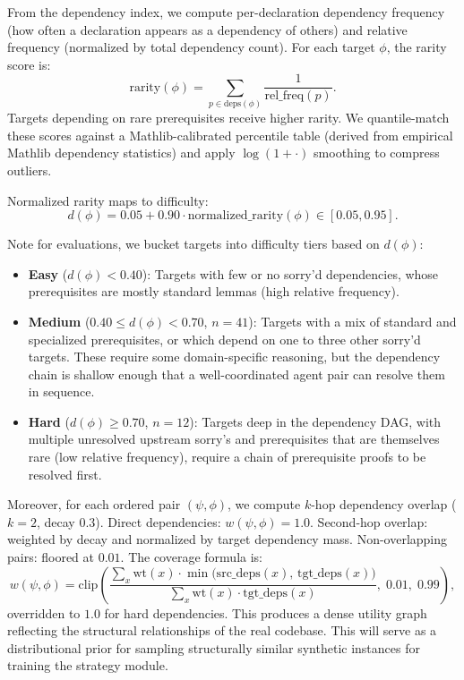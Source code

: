 From the dependency index, we compute per-declaration dependency frequency (how often a declaration appears as a dependency of others) and relative frequency (normalized by total dependency count). For each target $\phi$, the rarity score is:
\[
\mathrm{rarity}(\phi) = \sum_{p \in \mathrm{deps}(\phi)} \frac{1}{\mathrm{rel\_freq}(p)}.
\]
Targets depending on rare prerequisites receive higher rarity. We quantile-match these scores against a Mathlib-calibrated percentile table (derived from empirical Mathlib dependency statistics) and apply $\log(1+\cdot)$ smoothing to compress outliers.

Normalized rarity maps to difficulty:
\[
d(\phi) = 0.05 + 0.90 \cdot \mathrm{normalized\_rarity}(\phi) \in [0.05, 0.95].
\]

Note for evaluations, we bucket targets into difficulty tiers based on $d(\phi)$:
\begin{itemize}
    \item \textbf{Easy} ($d(\phi) < 0.40$): Targets with few or no sorry'd dependencies, whose prerequisites are mostly standard lemmas (high relative frequency). 
 
    \item \textbf{Medium} ($0.40 \le d(\phi) < 0.70$, $n=41$): Targets with a mix of standard and specialized prerequisites, or which depend on one to three other sorry'd targets. These require some domain-specific reasoning, but the dependency chain is shallow enough that a well-coordinated agent pair can resolve them in sequence.
 
    \item \textbf{Hard} ($d(\phi) \ge 0.70$, $n=12$): Targets deep in the dependency DAG, with multiple unresolved upstream sorry's and prerequisites that are themselves rare (low relative frequency), require a chain of prerequisite proofs to be resolved first.
\end{itemize}
 



Moreover, for each ordered pair $(\psi, \phi)$, we compute $k$-hop dependency overlap ($k=2$, decay $0.3$). Direct dependencies: $w(\psi, \phi) = 1.0$. Second-hop overlap: weighted by decay and normalized by target dependency mass. Non-overlapping pairs: floored at $0.01$. The coverage formula is:
\[
w(\psi, \phi) = \mathrm{clip}\!\left(\frac{\sum_x \mathrm{wt}(x) \cdot \min\big(\mathrm{src\_deps}(x),\, \mathrm{tgt\_deps}(x)\big)}{\sum_x \mathrm{wt}(x) \cdot \mathrm{tgt\_deps}(x)},\; 0.01,\; 0.99\right),
\]
overridden to $1.0$ for hard dependencies. This produces a dense utility graph reflecting the structural relationships of the real codebase. This will serve as a distributional prior for sampling structurally similar synthetic instances for training the strategy module.


